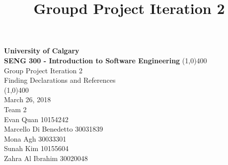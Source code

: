 \documentclass[12p]{article}
\title{\vspace{-6ex}Groupd Project Iteration 2}
\date{\vspace{-12ex}}
\begin{document}
\thispagestyle{fancy}

\begin{titlepage}
  \begin{center}
    \vspace{1cm}
    \Large{\textbf{University of Calgary}}\\
    \Large{\textbf{SENG 300  - Introduction to Software Engineering}}
    \vfill
    \line(1,0){400}\\[1mm]
    \huge{Group Project Iteration 2}\\
    \large{Finding Declarations and References}\\
    \line(1,0){400}\\
    \Large March 26, 2018\\
    \vfill
    \huge{Team 2}\\
    \Large
    Evan Quan 10154242\\
    Marcello Di Benedetto 30031839\\
    Mona Agh 30033301\\
    Sunah Kim 10155604\\
    Zahra Al Ibrahim 30020048\\
  \end{center}
\end{titlepage}

%
%
\end{document}
